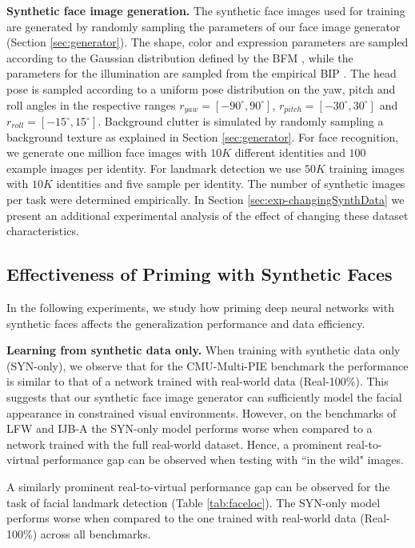 \documentclass[10pt,twocolumn,letterpaper]{article}
\begin{document}
\begin{table}
    \end{table}\textbf{Synthetic face image generation.} The synthetic face images used for training are generated by randomly sampling the parameters of our face image generator (Section \ref{sec:generator}). The shape, color and expression parameters are sampled according to the Gaussian distribution defined by the BFM \cite{bfm17}, while the parameters for the illumination are sampled from the empirical BIP \cite{illuprior}. The head pose is sampled according to a uniform pose distribution on the yaw, pitch and roll angles in the respective ranges $r_{yaw}=[ -90^\circ,90^\circ ]$, $r_{pitch}=[ -30^\circ,30^\circ ]$ and $r_{roll}=[ -15^\circ,15^\circ ]$. Background clutter is simulated by randomly sampling a background texture as explained in Section \ref{sec:generator}. For face recognition, we generate one million face images with $10K$ different identities and $100$ example images per identity. For landmark detection we use $50K$ training images with $10K$ identities and five sample per identity. The number of synthetic images per task were determined empirically. In Section \ref{sec:exp-changingSynthData} we present an additional experimental analysis of the effect of changing these dataset characteristics. 	

\subsection{Effectiveness of Priming with Synthetic Faces}\label{sec:exp-gapclose}    
	In the following experiments, we study how priming deep neural networks with synthetic faces affects the generalization performance and data efficiency.
	
	\textbf{Learning from synthetic data only.} When training with synthetic data only (SYN-only), we observe that for the CMU-Multi-PIE benchmark the performance is similar to that of a network trained with real-world data (Real-100\%). This suggests that our synthetic face image generator can sufficiently model the facial appearance in constrained visual environments. However, on the benchmarks of LFW and IJB-A the SYN-only model performs worse when compared to a network trained with the full real-world dataset. Hence, a prominent real-to-virtual performance gap can be observed when testing with ``in the wild" images. 
	
	A similarly prominent real-to-virtual performance gap can be observed for the task of facial landmark detection (Table \ref{tab:faceloc}). The SYN-only model performs worse when compared to the one trained with real-world data (Real-100\%) across all benchmarks.
\end{document}
